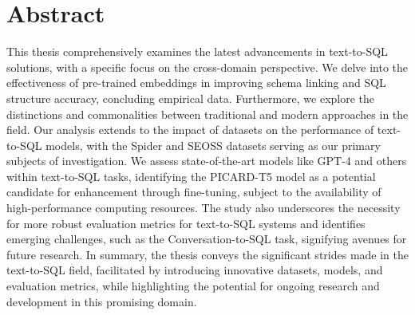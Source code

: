 \section*{Abstract}

This thesis comprehensively examines the latest advancements in text-to-SQL solutions, with a specific focus on the cross-domain perspective. We delve into the effectiveness of pre-trained embeddings in improving schema linking and SQL structure accuracy, concluding empirical data. Furthermore, we explore the distinctions and commonalities between traditional and modern approaches in the field.
Our analysis extends to the impact of datasets on the performance of text-to-SQL models, with the Spider and SEOSS datasets serving as our primary subjects of investigation. We assess state-of-the-art models like GPT-4 and others within text-to-SQL tasks, identifying the PICARD-T5 model as a potential candidate for enhancement through fine-tuning, subject to the availability of high-performance computing resources.
The study also underscores the necessity for more robust evaluation metrics for text-to-SQL systems and identifies emerging challenges, such as the Conversation-to-SQL task, signifying avenues for future research. In summary, the thesis conveys the significant strides made in the text-to-SQL field, facilitated by introducing innovative datasets, models, and evaluation metrics, while highlighting the potential for ongoing research and development in this promising domain.